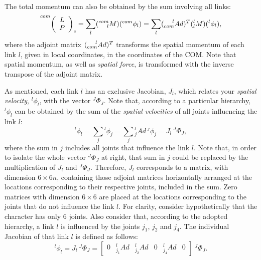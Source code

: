 \documentclass[tog]{acmsiggraph}
\begin{document}
The total momentum can also be obtained by the sum involving all links:
%
\begin{equation}
 \prescript{com}{}{ \left(\begin{array}{c} L \\ P \end{array}\right)_{c}} = \sum_l (\prescript{com}{l}{M})(^{com}\phi_{l})
                                                                          = \sum_l (\prescript{l}{com}{Ad})^{T} (^{l}_{l}M)(^{l}\phi_{l}),
\label{eq:MomSom}
\end{equation}
%
where the adjoint matrix $(\prescript{l}{com}{Ad})^{T}$ transforms the spatial momentum of each link $l$, given in local coordinates, in the coordinates 
of the COM. Note that spatial momentum, as well as \textit{spatial force}, is transformed with the inverse transpose of the adjoint matrix.

As mentioned, each link $l$ has an exclusive Jacobian, $J_{l}$, which relates your \textit{spatial velocity}, $^{l}\phi_{l}$, with the vector $^{J}\Phi_{J}$. 
Note that, according to a particular hierarchy, $^{l}\phi_{l}$ can be obtained by the sum of the \textit{spatial velocities} of all joints influencing the link $l$:
%
\begin{equation}
 ^{l}\phi_{l} = \sum_j {^{l}\phi_{j}} = \sum_j {^{l}_{j}Ad} ~ {^{j}\phi_{j}} = J_{l} ~ ^{J}\Phi_{J},
\label{eq:jacobIndividual}
\end{equation}
%
where the sum in $j$ includes all joints that influence the link $l$. Note that, in order to isolate the whole vector $^{J}\Phi_{J}$ at right, %
that sum in $j$ could be replaced by the multiplication of $J_{l}$ and $^{J}\Phi_{J}$. Therefore, $J_ {l}$ corresponds to a matrix, with dimension $6\times6n$,
containing those adjoint matrices horizontally arranged at the locations corresponding to their respective joints, included in the sum. %
%
Zero matrices with dimension $6\times6$ are placed at the locations corresponding to the joints that do not influence the link $l$.
%
For clarity, consider hypothetically that the character has only 6 joints. Also consider that, according to the adopted hierarchy, a link $l$
is influenced by the joints $j_{1}$, $j_{2}$ and $j_{4}$. The individual Jacobian of that link $l$ is defined as follows:
%
\begin{equation}
 ^{l}\phi_{l} = J_{l} ~ ^{J}\Phi_{J} = \left[ \begin{array}{cccccc} 0 & _{ j_{1} }^{l}Ad & _{ j_{2} }^{l}Ad & 0 & _{ j_{4} }^{l}Ad & 0
                                              \end{array} \right] ~ ^{J}\Phi_{J}.
\end{equation}
\end{document}
